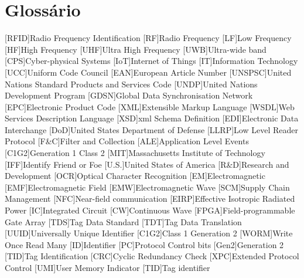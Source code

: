 \chapter{Glossário}

\footnotesize
\SingleSpacing

\begin{multicols}{2}
\begin{acronym}[AAAAAA]

	[RFID]{Radio Frequency Identification}
	[RF]{Radio Frequency}
	[LF]{Low Frequency}
	[HF]{High Frequency}
	[UHF]{Ultra High Frequency}
	[UWB]{Ultra-wide band}
	[CPS]{Cyber-physical Systems}
	[IoT]{Internet of Things}
	[IT]{Information Technology}
	[UCC]{Uniform Code Council}
	[EAN]{European Article Number}
	[UNSPSC]{United Nations Standard Products and Services Code}
	[UNDP]{United Nations Development Program}
	[GDSN]{Global Data Synchronisation Network}
	[EPC]{Electronic Product Code}
	[XML]{Extensible Markup Language}
	[WSDL]{Web Services Description Language}
	[XSD]{\acs{xml} Schema Definition}
	[EDI]{Electronic Data Interchange}
	[DoD]{United States Department of Defense}
	[LLRP]{Low Level Reader Protocol}
	[F\&C]{Filter and Collection}
	[ALE]{Application Level Events}
	[C1G2]{Generation 1 Class 2}
	[MIT]{Massachusetts Institute of Technology}
	[IFF]{Identify Friend or Foe}
	[U.S.]{United States of America}
	[R\&D]{Research and Development}
	[OCR]{Optical Character Recognition}
	[EM]{Electromagnetic}
	[EMF]{Electromagnetic Field}
	[EMW]{Electromagnetic Wave}
	[SCM]{Supply Chain Management}
	[NFC]{Near-field communication}
	[EIRP]{Effective Isotropic Radiated Power}
	[IC]{Integrated Circuit}
	[CW]{Continuous Wave}
	[FPGA]{Field-programmable Gate Array}
	[TDS]{Tag Data Standard}
	[TDT]{Tag Data Translation}
	[UUID]{Universally Unique Identifier}
	[C1G2]{Class 1 Generation 2}
	[WORM]{Write Once Read Many}
	[ID]{Identifier}
	[PC]{Protocol Control bits}
	[Gen2]{Generation 2}
	[TID]{Tag Identification}
	[CRC]{Cyclic Redundancy Check}
	[XPC]{Extended Protocol Control}
	[UMI]{User Memory Indicator}
	[TID]{Tag identifier}

\end{acronym}
\end{multicols}
